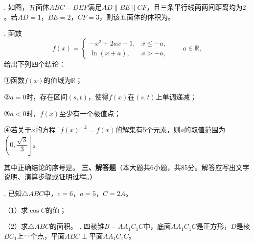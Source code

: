 . 如图，五面体$ABC-DEF$满足$AD\parallel BE\parallel CF$，且三条平行线两两间距离均为$2$。若$AD=1$，$BE=2$，$CF=3$，则该五面体的体积为\underline{\hspace{3cm}}。

\begin{center}
\end{center}

. 函数
\[
f(x)=\begin{cases}
-x^2+2ax+1,&x\leqslant-a,\\
\ln(x+a),&x>-a,
\end{cases}
\qquad a\in\mathbb{R},
\]
给出下列四个结论：

\noindent ①函数$f(x)$的值域为$\mathbb{R}$；

\noindent ②$a=0$时，存在区间$(s,t)$，使得$f(x)$在$(s,t)$上单调递减；

\noindent ③$a<0$时，$f(x)$至少有一个极值点；

\noindent ④若关于$x$的方程$[f(x)]^2=f(x)$的解集有5个元素，则$a$的取值范围为$\left(0,\dfrac{\sqrt3}{3}\right]$。

\noindent 其中正确结论的序号是\underline{\hspace{3cm}}。
\newpage
\noindent\textbf{三、解答题}（本大题共6小题，共85分。解答应写出文字说明、演算步骤或证明过程。）

. 已知$\triangle ABC$中，$c=6$，$a=5$，$C=2A$。

\noindent（1）求$\cos C$的值；

\noindent（2）求$\triangle ABC$的面积。
\newpage
{}. 四棱锥$B-AA_1C_1C$中，底面$AA_1C_1C$是正方形，$D$是棱$BC_1$上一个点，平面$ABC\perp$平面$AA_1C_1C$。

